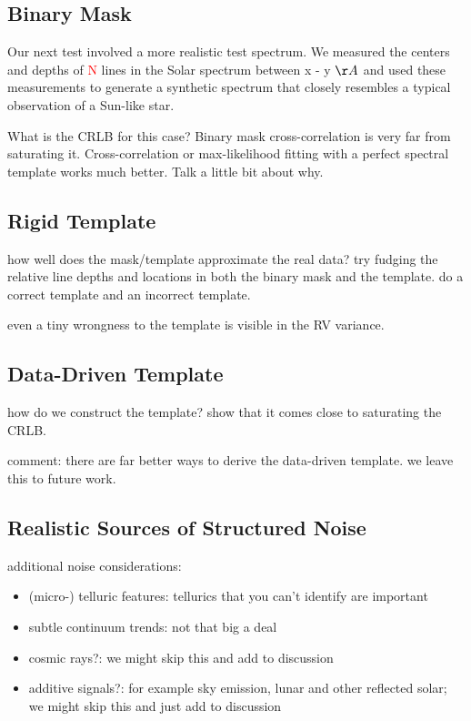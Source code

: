 \documentclass[modern]{aastex61}
\newcommand\todo[1]{\textcolor{red}{#1}}  %
\begin{document}
\subsection{Binary Mask}

Our next test involved a more realistic test spectrum. We measured the centers and depths of \todo{N} lines in the Solar spectrum between {x - y} $\AA$ and used these measurements to generate a synthetic spectrum that closely resembles a typical observation of a Sun-like star.

What is the CRLB for this case? Binary mask cross-correlation is very far from saturating it. Cross-correlation or max-likelihood fitting with a perfect spectral template works much better. Talk a little bit about why.

\subsection{Rigid Template}

how well does the mask/template approximate the real data? try fudging the relative line depths and locations in both the binary mask and the template. do a correct template and an incorrect template.

even a tiny wrongness to the template is visible in the RV variance.

\subsection{Data-Driven Template}

how do we construct the template? show that it comes close to saturating the CRLB.

comment: there are far better ways to derive the data-driven template. we leave this to future work.

\subsection{Realistic Sources of Structured Noise}

additional noise considerations:
\begin{itemize}
\item (micro-) telluric features: tellurics that you can't identify are important
\item subtle continuum trends: not that big a deal
\item cosmic rays?: we might skip this and add to discussion
\item additive signals?: for example sky emission, lunar and other reflected solar; we might skip this and just add to discussion
\end{itemize}
\end{document}
